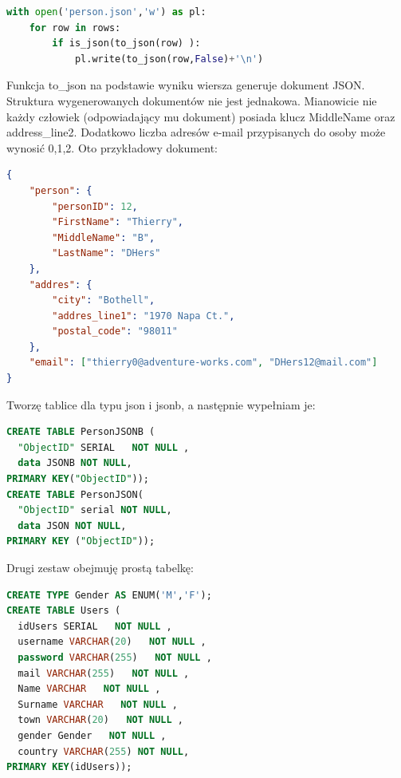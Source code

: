 \documentclass[a4paper,12pt,table]{article}
\begin{document}
{\begin{lstlisting}[language=Python]
with open('person.json','w') as pl:
	for row in rows:
		if is_json(to_json(row) ):
			pl.write(to_json(row,False)+'\n')
\end{lstlisting}
\vspace{0.5cm}
Funkcja to\_json na podstawie wyniku wiersza generuje dokument JSON. Struktura wygenerowanych dokumentów nie jest jednakowa. Mianowicie nie każdy człowiek (odpowiadający mu dokument) posiada klucz MiddleName oraz address\_line2. Dodatkowo liczba adresów e-mail przypisanych do osoby może wynosić 0,1,2.
\newpage
Oto przykładowy dokument:
\begin{lstlisting}[language=JSON]
{
	"person": {
		"personID": 12,
		"FirstName": "Thierry",
		"MiddleName": "B",
		"LastName": "DHers"
	},
	"addres": {
		"city": "Bothell",
		"addres_line1": "1970 Napa Ct.",
		"postal_code": "98011"
	},
	"email": ["thierry0@adventure-works.com", "DHers12@mail.com"]
}
\end{lstlisting}
\vspace{0.5cm}
Tworzę tablice dla typu json i jsonb, a następnie wypełniam je:
\begin{lstlisting}[language=SQL]
CREATE TABLE PersonJSONB (
  "ObjectID" SERIAL   NOT NULL ,
  data JSONB NOT NULL,
PRIMARY KEY("ObjectID"));
CREATE TABLE PersonJSON(
  "ObjectID" serial NOT NULL,
  data JSON NOT NULL,
PRIMARY KEY ("ObjectID"));
\end{lstlisting}
\vspace{0.5cm}
Drugi zestaw obejmuję prostą tabelkę:
\begin{lstlisting}[language=SQL]
CREATE TYPE Gender AS ENUM('M','F');
CREATE TABLE Users (
  idUsers SERIAL   NOT NULL ,
  username VARCHAR(20)   NOT NULL ,
  password VARCHAR(255)   NOT NULL ,
  mail VARCHAR(255)   NOT NULL ,
  Name VARCHAR   NOT NULL ,
  Surname VARCHAR   NOT NULL ,
  town VARCHAR(20)   NOT NULL ,
  gender Gender   NOT NULL ,
  country VARCHAR(255) NOT NULL,
PRIMARY KEY(idUsers));
\end{lstlisting}
\vspace{0.5cm}
\setlength{\parskip}{0.5\bigskipamount plus \smallskipamount minus \smallskipamount}
\newpage
}
\end{document}
